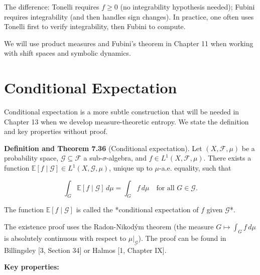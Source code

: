 \begin{remark}
The difference: Tonelli requires $f \geq 0$ (no integrability hypothesis needed); Fubini requires integrability (and then handles sign changes). In practice, one often uses Tonelli first to verify integrability, then Fubini to compute.

We will use product measures and Fubini's theorem in Chapter 11 when working with shift spaces and symbolic dynamics.


\bigskip

\end{remark}


\section{Conditional Expectation}\label{sec:7.7}

Conditional expectation is a more subtle construction that will be needed in Chapter 13 when we develop measure-theoretic entropy. We state the definition and key properties without proof.

\textbf{Definition and Theorem 7.36} (Conditional expectation). Let $(X, \mathcal{F}, \mu)$ be a probability space, $\mathcal{G} \subseteq \mathcal{F}$ a sub-$\sigma$-algebra, and $f \in L^1(X, \mathcal{F}, \mu)$. There exists a function $\mathbb{E}[f \mid \mathcal{G}] \in L^1(X, \mathcal{G}, \mu)$, unique up to $\mu$-a.e. equality, such that

\[
\int_G \mathbb{E}[f \mid \mathcal{G}] \, d\mu = \int_G f \, d\mu \quad \text{for all } G \in \mathcal{G}.
\]

The function $\mathbb{E}[f \mid \mathcal{G}]$ is called the *conditional expectation of $f$ given $\mathcal{G}$*.

The existence proof uses the Radon-Nikod\'{y}m theorem (the measure $G \mapsto \int_G f \, d\mu$ is absolutely continuous with respect to $\mu|_\mathcal{G}$). The proof can be found in Billingsley [3, Section 34] or Halmos [1, Chapter IX].

\textbf{Key properties:}

